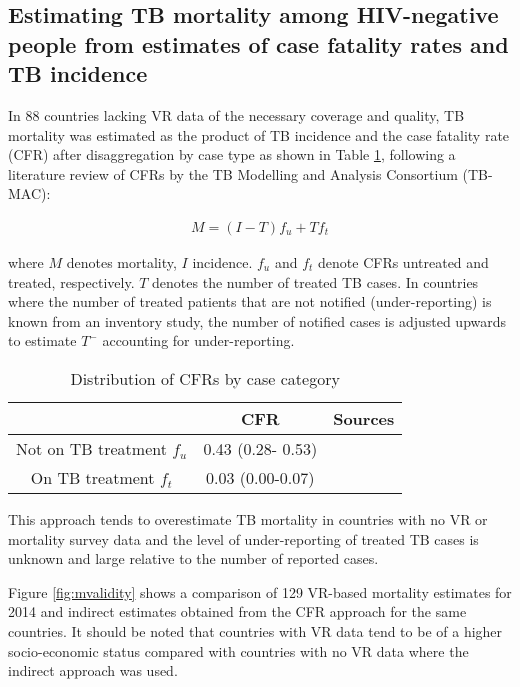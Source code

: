 \subsection{Estimating TB mortality among HIV-negative people from estimates of case fatality rates and TB incidence
}

In 88 countries lacking VR data of the necessary coverage and quality, TB mortality was estimated as the product of TB incidence and the case fatality rate (CFR) after disaggregation by case type as shown in Table \ref{tab:cfr}, following a literature review of CFRs by the TB Modelling and Analysis Consortium (TB-MAC):

\begin{align*}
M = (I -T)f_u + Tf_t 
\end{align*}

where $M$ denotes mortality, $I$ incidence. $f_u$ and $f_t$ denote CFRs untreated and treated, respectively. $T$ denotes the number of treated TB cases. In countries where the number of treated patients that are not notified (under-reporting) is known from an inventory study, the number of notified cases is adjusted upwards to estimate $T^{-}$ accounting for under-reporting. 

\begin{table} 
    \begin{tabular}{ c c c }
    \hline
         & CFR & Sources \\ 
         \hline
        Not on TB treatment $f_u$ & 0.43 (0.28- 0.53) &  \cite{12742798} \cite{21483732} \\ 
        On TB treatment $f_t$ & 0.03 (0.00-0.07) &  \cite{21738585} \\ 
        \hline
    \end{tabular} 
    \caption{Distribution of CFRs by case category} 
    \label{tab:cfr}
\end{table}

This approach tends to overestimate TB mortality in countries with no VR or mortality survey data and the level of under-reporting of treated TB cases is unknown and large relative to the number of reported cases. 

Figure \ref{fig:mvalidity} shows a comparison of 129 VR-based mortality estimates for 2014 and indirect estimates obtained from the CFR approach for the same countries. It should be noted that countries with VR data tend to be of a higher socio-economic status compared with countries with no VR data where the indirect approach was used.



